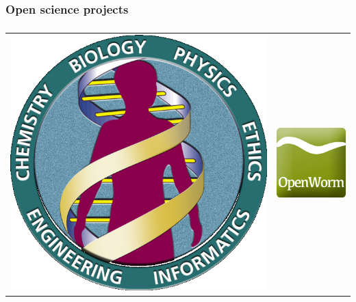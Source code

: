 \documentclass{beamer}
\begin{document}
\subsubsection{Open science projects}
\begin{frame}\frametitle{\subsubsecname}
\centering
\begin{tabular}{cc}
	\includegraphics[height=0.3\textheight]{gfx/present/HGP}
	&
	\includegraphics[height=0.3\textheight]{gfx/present/OpenWormLogo}
	\\

\end{tabular}
\end{frame}
\end{document}
